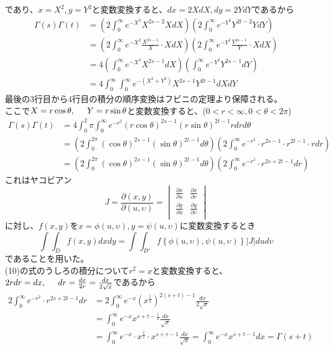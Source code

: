 \documentclass{jsarticle}
\begin{document}
であり、\(x=X^2,y=Y^2\)と変数変換すると、\(dx=2XdX,dy=2YdY\)であるから
\begin{align*}
\Gamma(s)\Gamma(t)&=\left(2\int_{0}^{\infty}e^{-X^2}X^{2s-2}XdX\right)\left(2\int_{0}^{\infty}e^{-Y^2}Y^{2t-2}YdY\right)\\
&=\left(2\int_{0}^{\infty}e^{-X^2}\frac{X^{2s-1}}{X}\cdot XdX\right)\left(2\int_{0}^{\infty}e^{-Y^2}\frac{Y^{2s-1}}{Y}\cdot XdX\right)\\
&=4\left(\int_{0}^{\infty}e^{-X^2}X^{2s-1}dX\right)\left(\int_{0}^{\infty}e^{-Y^2}Y^{2s-1}dY\right)\\
&=4\int_{0}^{\infty}\int_{0}^{\infty}e^{-(X^2+Y^2)}X^{2s-1}Y^{2t-1}dXdY
\end{align*}
最後の3行目から4行目の積分の順序変換はフビニの定理より保障される。\\
ここで\(X=r\cos\theta,\hspace{5mm}Y=r\sin\theta\)と変数変換すると、(\(0<r<\infty,0<\theta<2\pi\))
\begin{align}
\Gamma(s)\Gamma(t)&=4\int_{0}^{2}\pi\int_{0}^{\infty}e^{-r^2}(r\cos\theta)^{2s-1}(r\sin\theta)^{2t-1}rdrd\nonumber\theta\\
&=\left(2\int_{0}^{2\pi}(\cos\theta)^{2s-1}(\sin\theta)^{2t-1}d\theta\right)\left(2\int_{0}^{\infty}e^{-r^2}\cdot r^{2s-1}\cdot r^{2t-1}\cdot rdr\right)\nonumber\\
&=\left(2\int_{0}^{2\pi}(\cos\theta)^{2s-1}(\sin\theta)^{2t-1}d\theta\right)\left(2\int_{0}^{\infty}e^{-r^2}\cdot r^{2s+2t-1}dr\right)
\end{align}
これはヤコビアン
\[J=\frac{\partial(x,y)}{\partial(u,\upsilon)}=
\begin{vmatrix}
\frac{\partial x}{\partial u} & \frac{\partial x}{\partial\upsilon}\\
\frac{\partial y}{\partial u} & \frac{\partial y}{\partial\upsilon}\\
\end{vmatrix}
\]
に対し、\(f(x,y)\)を\(x=\phi(u,\upsilon),y=\psi(u,\upsilon)\)に変数変換するとき
\[\int\int_{D}f(x,y)dxdy=\int\int_{D'}f\left\{\phi(u,\upsilon),\psi(u,\upsilon)\right\}\left|J\right|dud\upsilon\]
であることを用いた。\\
(10)の式のうしろの積分について\(r^{2}=x\)と変数変換すると、\(2rdr=dx,\hspace{5mm}dr=\frac{dx}{2r}=\frac{dx}{2\sqrt{x}}\)であるから
\begin{align*}
2\int_{0}^{\infty}e^{-r^2}\cdot r^{2s+2t-1}dr&=2\int_{0}^{\infty}e^{-x}\left(x^{\frac{1}{2}}\right)^{2(s+t)-1}\frac{dx}{2\sqrt{x}}\\
&=\int_{0}^{\infty}e^{-x}x^{s+t-\frac{1}{2}}\frac{dx}{\sqrt{x}}\\
&=\int_{0}^{\infty}e^{-x}\cdot x^{\frac{1}{2}}\cdot x^{s+r-1}\frac{dx}{\sqrt{x}}=\int_{0}^{\infty}e^{-x}x^{s+t-1}dx=\Gamma(s+t)
\end{align*}
\end{document}
